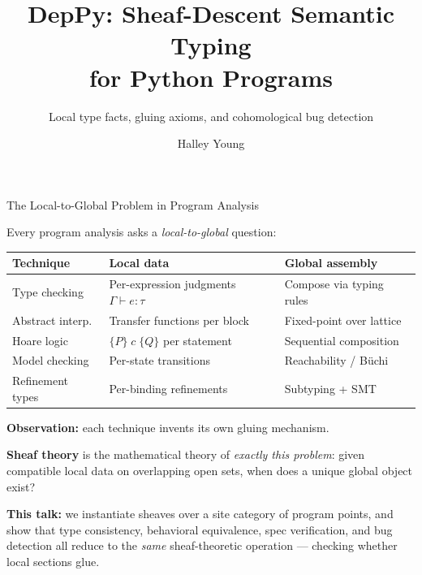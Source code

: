 \documentclass[aspectratio=169,11pt]{beamer}
\title{\textbf{DepPy}: Sheaf-Descent Semantic Typing\\for Python Programs}
\subtitle{Local type facts, gluing axioms, and cohomological bug detection}
\author{Halley Young}
\date{}
\begin{document}
\begin{frame}
\titlepage
\end{frame}

\begin{frame}{The Local-to-Global Problem in Program Analysis}

Every program analysis asks a \emph{local-to-global} question:

\vspace{0.3em}
\begin{center}
\begin{tabular}{@{}lll@{}}
\textbf{Technique} & \textbf{Local data} & \textbf{Global assembly} \\
\hline
Type checking    & Per-expression judgments $\Gamma \vdash e : \tau$ & Compose via typing rules \\
Abstract interp. & Transfer functions per block & Fixed-point over lattice \\
Hoare logic      & $\{P\}\; c\; \{Q\}$ per statement & Sequential composition \\
Model checking   & Per-state transitions & Reachability / B\"uchi \\
Refinement types & Per-binding refinements & Subtyping + SMT \\
\end{tabular}
\end{center}

\vspace{0.4em}
\textbf{Observation:} each technique invents its own gluing mechanism.

\vspace{0.3em}
\textbf{Sheaf theory} is the mathematical theory of \emph{exactly this problem}:
given compatible local data on overlapping open sets, when does a
unique global object exist?

\vspace{0.3em}
{\small \textbf{This talk:} we instantiate sheaves over a site category of program points,
and show that type consistency, behavioral equivalence, spec verification, and
bug detection all reduce to the \emph{same} sheaf-theoretic operation — checking
whether local sections glue.}

\end{frame}
\end{document}
